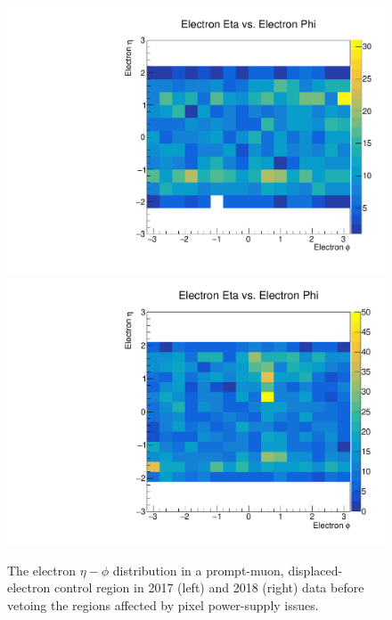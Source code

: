 \begin{figure}[hbtp]
\centering
\includegraphics[scale=0.3]{figures/selection/displacedE_etaPhi_data_2017.pdf}
\includegraphics[scale=0.3]{figures/selection/displacedE_etaPhi_data_2018.pdf}
\caption{The electron $\eta-\phi$ distribution in a prompt-muon, displaced-electron control region in 2017 (left) and 2018 (right) data before vetoing the regions affected by pixel power-supply issues.}
\label{eta_phi_vetos}
\end{figure}
